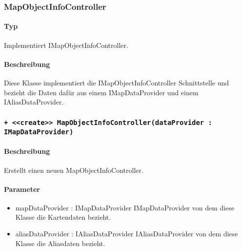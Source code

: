 \subsubsection{MapObjectInfoController}
\paragraph*{Typ}
Implementiert IMapObjectInfoController.
\paragraph*{Beschreibung}
Diese Klasse implementiert die IMapObjectInfoController Schnittstelle und bezieht die Daten 
dafür aus einem IMapDataProvider und einem IAliasDataProvider.

\subsubsection*{\texttt{+ <<create>> MapObjectInfoController(dataProvider : IMapDataProvider)}}%
\paragraph*{Beschreibung}
Erstellt einen neuen MapObjectInfoController.
\paragraph*{Parameter}
\begin{itemize}
    \item mapDataProvider : IMapDataProvider IMapDataProvider von dem diese Klasse die Kartendaten bezieht.
    \item aliasDataProvider : IAliasDataProvider IAliasDataProvider von dem diese Klasse die Aliasdaten bezieht.
\end{itemize}

